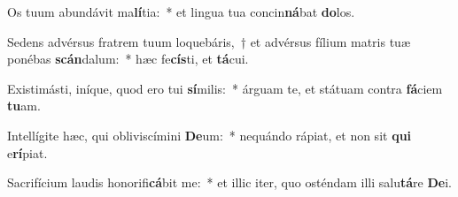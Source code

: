 \item Os tuum abundávit ma\textbf{lí}tia:~* et lingua tua concin\textbf{ná}bat \textbf{do}los.
\item Sedens advérsus fratrem tuum loquebáris,~† et advérsus fílium matris tuæ ponébas \textbf{scán}dalum:~* hæc fe\textbf{cís}ti, et \textbf{tá}cui.
\item Existimásti, iníque, quod ero tui \textbf{sí}milis:~* árguam te, et státuam contra \textbf{fá}ciem \textbf{tu}am.
\item Intellígite hæc, qui obliviscímini \textbf{De}um:~* nequándo rápiat, et non sit \textbf{qui} e\textbf{rí}piat.
\item Sacrifícium laudis honorifi\textbf{cá}bit me:~* et illic iter, quo osténdam illi salu\textbf{tá}re \textbf{De}i.
